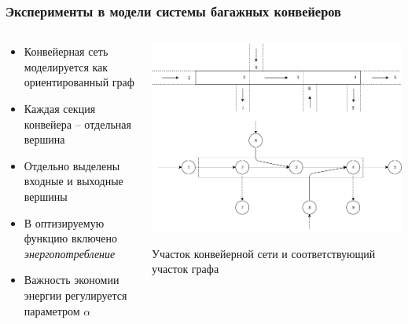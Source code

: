 \documentclass{beamer}
\begin{document}

\begin{frame}
  \frametitle{Эксперименты в модели системы багажных конвейеров}
  \begin{columns}
    \begin{column}{0.5\textwidth} 
      \begin{itemize}
      \item Конвейерная сеть моделируется как ориентированный граф
      \item Каждая секция конвейера -- отдельная вершина
      \item Отдельно выделены входные и выходные вершины
      \item В оптизируемую функцию включено \textit{энергопотребление}
      \item Важность экономии энергии регулируется параметром $\alpha$
      \end{itemize}
    \end{column}
    \begin{column}{0.5\textwidth}
      \includegraphics[width=\textwidth]{belt-illustration}  

      Участок конвейерной сети и соответствующий участок графа
    \end{column}
  \end{columns}
\end{frame}

\end{document}
